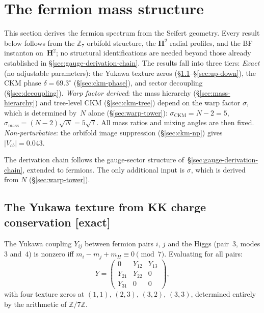 \section{The fermion mass structure}
\label{sec:fermions}

This section derives the fermion spectrum from the Seifert geometry.
Every result below follows from the $\mathbb{Z}_7$ orbifold structure,
the $\mathbf{H}^2$ radial profiles, and the BF instanton on~$\mathbf{H}^2$;
no structural identifications are needed beyond those already
established in \S\ref{sec:gauge-derivation-chain}.
The results fall into three tiers:
\emph{Exact} (no adjustable parameters):
the Yukawa texture zeros (\S\ref{sec:yukawa}--\S\ref{sec:up-down}),
the CKM phase $\delta = 69.3^\circ$ (\S\ref{sec:ckm-phase}),
and sector decoupling (\S\ref{sec:decoupling}).
\emph{Warp factor derived}:
the mass hierarchy (\S\ref{sec:mass-hierarchy}) and
tree-level CKM (\S\ref{sec:ckm-tree}) depend on the warp
factor $\sigma$, which is determined by~$N$ alone
(\S\ref{sec:warp-tower}):
$\sigma_{\mathrm{CKM}} = N{-}2 = 5$,
$\sigma_{\mathrm{mass}} = (N{-}2)\sqrt{N} = 5\sqrt{7}$.
All mass ratios and mixing angles are then fixed.
\emph{Non-perturbative}:
the orbifold image suppression (\S\ref{sec:ckm-np}) gives
$|V_{cb}| = 0.043$.

\medskip\noindent
The derivation chain follows the gauge-sector structure
of~\S\ref{sec:gauge-derivation-chain}, extended to fermions.
The only additional input is $\sigma$,
which is derived from $N$ (\S\ref{sec:warp-tower}).

\subsection{The Yukawa texture from KK charge conservation \textnormal{[exact]}}
\label{sec:yukawa}

The Yukawa coupling $Y_{ij}$ between fermion pairs $i$, $j$ and the
Higgs (pair~3, modes $3$ and~$4$) is nonzero iff
$m_i - m_j + m_H \equiv 0 \pmod{7}$.
Evaluating for all pairs:
\begin{equation}\label{eq:yukawa-texture}
  Y = \begin{pmatrix}
    0 & Y_{12} & Y_{13} \\
    Y_{21} & Y_{22} & 0 \\
    Y_{31} & 0 & 0
  \end{pmatrix},
\end{equation}
with four texture zeros at $(1,1)$, $(2,3)$, $(3,2)$, $(3,3)$, determined
entirely by the arithmetic of $\mathbb{Z}/7\mathbb{Z}$.

